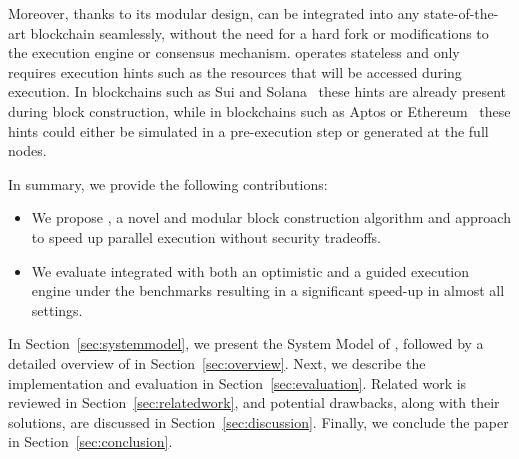 Moreover, thanks to its modular design, \sys can be integrated into any state-of-the-art blockchain seamlessly, without the need for a hard fork or modifications to the execution engine or consensus mechanism. \sys operates stateless and only requires execution hints such as the resources that will be accessed during execution. In blockchains such as Sui and Solana~\cite{sui,solana} these hints are already present during block construction, while in blockchains such as Aptos or Ethereum~\cite{aptos,ethereum} these hints could either be simulated in a pre-execution step or generated at the full nodes.

In summary, we provide the following contributions:

\begin{itemize}
    \item We propose \sys, a novel and modular block construction algorithm and approach to speed up parallel execution without security tradeoffs.
    \item We evaluate \sys integrated with both an optimistic and a guided execution engine under the \basesys benchmarks resulting in a significant speed-up in almost all settings.
\end{itemize}

In Section~\ref{sec:systemmodel}, we present the System Model of \sys, followed by a detailed overview of \sys in Section~\ref{sec:overview}. Next, we describe the implementation and evaluation in Section~\ref{sec:evaluation}. Related work is reviewed in Section~\ref{sec:relatedwork}, and potential drawbacks, along with their solutions, are discussed in Section~\ref{sec:discussion}. Finally, we conclude the paper in Section~\ref{sec:conclusion}.